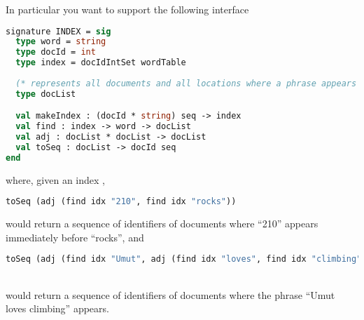 In particular you want to support the following interface
%
\begin{lstlisting}[language=Caml,numbers=none]
signature INDEX = sig
  type word = string
  type docId = int
  type index = docIdIntSet wordTable
  
  (* represents all documents and all locations where a phrase appears *)
  type docList

  val makeIndex : (docId * string) seq -> index    
  val find : index -> word -> docList
  val adj : docList * docList -> docList
  val toSeq : docList -> docId seq 
end
\end{lstlisting}
%
where, given an index ,
%
\begin{lstlisting}[language=Caml,numbers=none]
toSeq (adj (find idx "210", find idx "rocks"))
\end{lstlisting}
%
would return a sequence of identifiers of documents
where ``210'' appears immediately before ``rocks'', and 
\\
\begin{lstlisting}[language=Caml,numbers=none]
toSeq (adj (find idx "Umut", adj (find idx "loves", find idx "climbing")))
\end{lstlisting}
~\\
would return a sequence of identifiers of documents
where the phrase ``Umut loves climbing'' appears.

